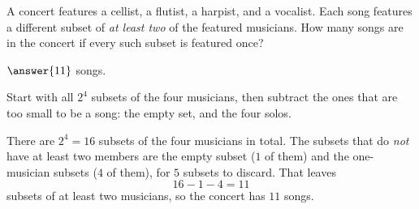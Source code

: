 \documentclass[12pt]{ximera}
\begin{document}
\begin{problem}
A concert features a cellist, a flutist, a harpist, and a vocalist. Each song
features a different subset of \emph{at least two} of the featured musicians. How
many songs are in the concert if every such subset is featured once?

$\answer{11}$ songs.

\begin{hint}
Start with all $2^4$ subsets of the four musicians, then subtract the ones that are
too small to be a song: the empty set, and the four solos.
\end{hint}

\begin{feedback}
There are $2^4=16$ subsets of the four musicians in total. The subsets that do
\emph{not} have at least two members are the empty subset ($1$ of them) and the
one-musician subsets ($4$ of them), for $5$ subsets to discard. That leaves
\[ 16 - 1 - 4 = 11 \]
subsets of at least two musicians, so the concert has $11$ songs.
\end{feedback}
\end{problem}
\end{document}
